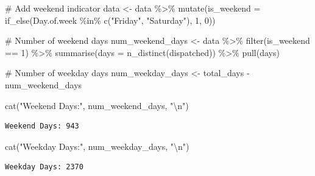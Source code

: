 \documentclass[
  letterpaper,
  DIV=11,
  numbers=noendperiod]{scrartcl}
\newenvironment{Shaded}{\begin{snugshade}}{\end{snugshade}}
\newcommand{\AttributeTok}[1]{\textcolor[rgb]{0.40,0.45,0.13}{#1}}
\newcommand{\CommentTok}[1]{\textcolor[rgb]{0.37,0.37,0.37}{#1}}
\newcommand{\DecValTok}[1]{\textcolor[rgb]{0.68,0.00,0.00}{#1}}
\newcommand{\FunctionTok}[1]{\textcolor[rgb]{0.28,0.35,0.67}{#1}}
\newcommand{\NormalTok}[1]{\textcolor[rgb]{0.00,0.23,0.31}{#1}}
\newcommand{\OtherTok}[1]{\textcolor[rgb]{0.00,0.23,0.31}{#1}}
\newcommand{\SpecialCharTok}[1]{\textcolor[rgb]{0.37,0.37,0.37}{#1}}
\newcommand{\StringTok}[1]{\textcolor[rgb]{0.13,0.47,0.30}{#1}}
\begin{document}
\begin{Shaded}
\begin{Highlighting}[]
\CommentTok{\# Add weekend indicator}
\NormalTok{data }\OtherTok{\textless{}{-}}\NormalTok{ data }\SpecialCharTok{\%\textgreater{}\%}
  \FunctionTok{mutate}\NormalTok{(}\AttributeTok{is\_weekend =} \FunctionTok{if\_else}\NormalTok{(Day.of.week }\SpecialCharTok{\%in\%} \FunctionTok{c}\NormalTok{(}\StringTok{"Friday"}\NormalTok{, }\StringTok{"Saturday"}\NormalTok{), }\DecValTok{1}\NormalTok{, }\DecValTok{0}\NormalTok{))}

\CommentTok{\# Number of weekend days}
\NormalTok{num\_weekend\_days }\OtherTok{\textless{}{-}}\NormalTok{ data }\SpecialCharTok{\%\textgreater{}\%}
  \FunctionTok{filter}\NormalTok{(is\_weekend }\SpecialCharTok{==} \DecValTok{1}\NormalTok{) }\SpecialCharTok{\%\textgreater{}\%}
  \FunctionTok{summarise}\NormalTok{(}\AttributeTok{days =} \FunctionTok{n\_distinct}\NormalTok{(dispatched)) }\SpecialCharTok{\%\textgreater{}\%}
  \FunctionTok{pull}\NormalTok{(days)}

\CommentTok{\# Number of weekday days}
\NormalTok{num\_weekday\_days }\OtherTok{\textless{}{-}}\NormalTok{ total\_days }\SpecialCharTok{{-}}\NormalTok{ num\_weekend\_days}

\FunctionTok{cat}\NormalTok{(}\StringTok{"Weekend Days:"}\NormalTok{, num\_weekend\_days, }\StringTok{"}\SpecialCharTok{\textbackslash{}n}\StringTok{"}\NormalTok{)}
\end{Highlighting}
\end{Shaded}

\begin{verbatim}
Weekend Days: 943 
\end{verbatim}

\begin{Shaded}
\begin{Highlighting}[]
\FunctionTok{cat}\NormalTok{(}\StringTok{"Weekday Days:"}\NormalTok{, num\_weekday\_days, }\StringTok{"}\SpecialCharTok{\textbackslash{}n}\StringTok{"}\NormalTok{)}
\end{Highlighting}
\end{Shaded}

\begin{verbatim}
Weekday Days: 2370 
\end{verbatim}
\end{document}
